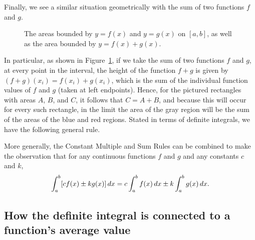 Finally, we see a similar situation geometrically with the sum of two functions $f$ and $g$.
\begin{figure}[h]
\begin{center}
\caption{The areas bounded by $y = f(x)$ and $y = g(x)$ on $[a,b]$, as well as the area bounded by $y = f(x) + g(x)$.} \label{F:4.3.Sum}
\end{center}
\end{figure}
In particular, as shown in Figure~\ref{F:4.3.Sum}, if we take the sum of two functions $f$ and $g$, at every point in the interval, the height of the function $f+g$ is given by $(f+g)(x_i) = f(x_i) + g(x_i)$, which is the sum of the individual function values of $f$ and $g$ (taken at left endpoints).  Hence, for the pictured rectangles with areas $A$, $B$, and $C$, it follows that $C = A + B$, and because this will occur for every such rectangle, in the limit the area of the gray region will be the sum of the areas of the blue and red regions.  Stated in terms of definite integrals, we have the following general rule.

\vspace*{5pt}
\nin {}
\vspace*{1pt}

More generally, the Constant Multiple and Sum Rules can be combined to make the observation that for any continuous functions $f$ and $g$ and any constants $c$ and $k$,
$$\displaystyle \int_a^b [c f(x) \pm k g(x)] \,dx = c \int_a^b f(x) \,dx \pm k \int_a^b g(x) \,dx.$$



\subsection*{How the definite integral is connected to a function's average value} 

